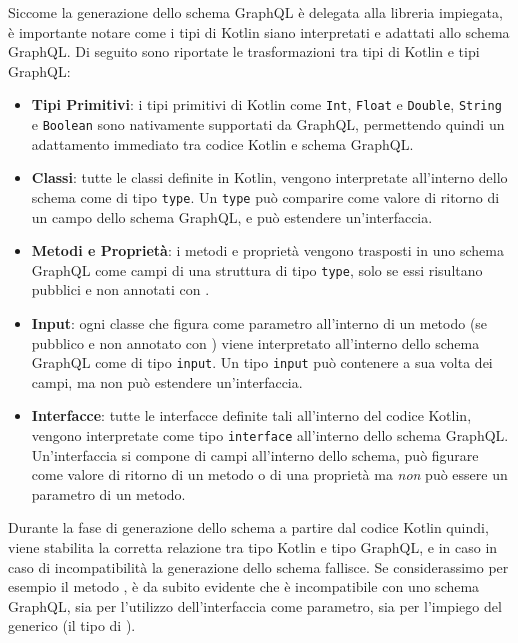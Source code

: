 Siccome la generazione dello schema GraphQL è delegata alla libreria impiegata, è importante notare come i tipi di Kotlin siano interpretati e adattati
allo schema GraphQL. Di seguito sono riportate le trasformazioni tra tipi di Kotlin e tipi GraphQL:
\begin{itemize}
    \item \textbf{Tipi Primitivi}: i tipi primitivi di Kotlin come \texttt{Int}, \texttt{Float} e \texttt{Double}, \texttt{String} e \texttt{Boolean}
        sono nativamente supportati da GraphQL, permettendo quindi un adattamento immediato tra codice Kotlin e schema GraphQL.
    \item \textbf{Classi}: tutte le classi definite in Kotlin, vengono interpretate all'interno dello schema come di tipo \texttt{type}. Un \texttt{type}
        può comparire come valore di ritorno di un campo dello schema GraphQL, e può estendere un'interfaccia.
    \item \textbf{Metodi e Proprietà}: i metodi e proprietà vengono trasposti in uno schema GraphQL come campi di una struttura di tipo
        \texttt{type}, solo se essi risultano pubblici e non annotati con .
    \item \textbf{Input}: ogni classe che figura come parametro all'interno di un metodo (se pubblico e non annotato con ) viene
        interpretato all'interno dello schema GraphQL come di tipo \texttt{input}. Un tipo \texttt{input} può contenere a sua volta dei campi,
        ma non può estendere un'interfaccia.
    \item \textbf{Interfacce}: tutte le interfacce definite tali all'interno del codice Kotlin, vengono interpretate come tipo \texttt{interface} all'interno
        dello schema GraphQL. Un'interfaccia si compone di campi all'interno dello schema, può figurare come valore di ritorno di un metodo o di una proprietà
        ma \textit{non} può essere un parametro di un metodo.
\end{itemize}
Durante la fase di generazione dello schema a partire dal codice Kotlin quindi, viene stabilita la corretta relazione tra tipo Kotlin e tipo GraphQL, e
in caso in caso di incompatibilità la generazione dello schema fallisce. Se considerassimo per esempio il metodo ,
è da subito evidente che è incompatibile con uno schema GraphQL, sia per l'utilizzo dell'interfaccia  come parametro, sia
per l'impiego del generico  (il tipo di ).

